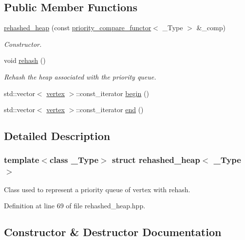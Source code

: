 \subsection*{Public Member Functions}
\begin{DoxyCompactItemize}
\item 
\hyperlink{structrehashed__heap_a35816ab91f931f81d11ae222a46ae103}{rehashed\+\_\+heap} (const \hyperlink{structpriority__compare__functor}{priority\+\_\+compare\+\_\+functor}$<$ \+\_\+\+Type $>$ \&\+\_\+comp)
\begin{DoxyCompactList}\small\item\em Constructor. \end{DoxyCompactList}\item 
void \hyperlink{structrehashed__heap_a43e3519a4d0034bb0e46807f3b6fa2d2}{rehash} ()
\begin{DoxyCompactList}\small\item\em Rehash the heap associated with the priority queue. \end{DoxyCompactList}\item 
std\+::vector$<$ \hyperlink{graph_8hpp_abefdcf0544e601805af44eca032cca14}{vertex} $>$\+::const\+\_\+iterator \hyperlink{structrehashed__heap_ae0343798d9399ca2fb9623de6b9315d5}{begin} ()
\item 
std\+::vector$<$ \hyperlink{graph_8hpp_abefdcf0544e601805af44eca032cca14}{vertex} $>$\+::const\+\_\+iterator \hyperlink{structrehashed__heap_a2f8bb7618d597af59dfcce52cd7223d4}{end} ()
\end{DoxyCompactItemize}


\subsection{Detailed Description}
\subsubsection*{template$<$class \+\_\+\+Type$>$\newline
struct rehashed\+\_\+heap$<$ \+\_\+\+Type $>$}

Class used to represent a priority queue of vertex with rehash. 

Definition at line 69 of file rehashed\+\_\+heap.\+hpp.



\subsection{Constructor \& Destructor Documentation}
\mbox{\label{structrehashed__heap_a35816ab91f931f81d11ae222a46ae103}} 
